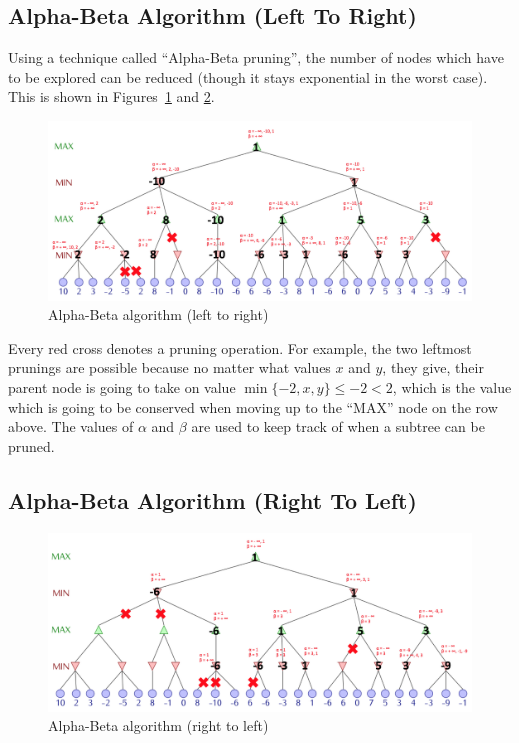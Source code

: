 \documentclass[journal,onecolumn]{IEEEtran}
\begin{document}
\subsection{Alpha-Beta Algorithm (Left To Right)}
Using a technique called ``Alpha-Beta pruning'', the number of nodes which have to be explored can be reduced (though it stays exponential in the worst case).
This is shown in Figures~\ref{fig:alphabeta} and \ref{fig:alphabeta_reverse}.
\begin{figure}[H]
 \centering
 \includegraphics[width=\textwidth]{img/Alphabeta.png}
 \caption{Alpha-Beta algorithm (left to right)}
 \label{fig:alphabeta}
\end{figure}
Every red cross denotes a pruning operation.
For example, the two leftmost prunings are possible because no matter what values \(x\) and \(y\), they give, their parent node is going to take on value \(\min\{-2, x, y\} \le -2 < 2\), which is the value which is going to be conserved when moving up to the ``MAX'' node on the row above.
The values of \(\alpha\) and \(\beta\) are used to keep track of when a subtree can be pruned.

\subsection{Alpha-Beta Algorithm (Right To Left)}
\begin{figure}[H]
 \centering
 \includegraphics[width=\textwidth]{img/Alphabeta_reverse.png}
 \caption{Alpha-Beta algorithm (right to left)}
 \label{fig:alphabeta_reverse}
\end{figure}
\end{document}
